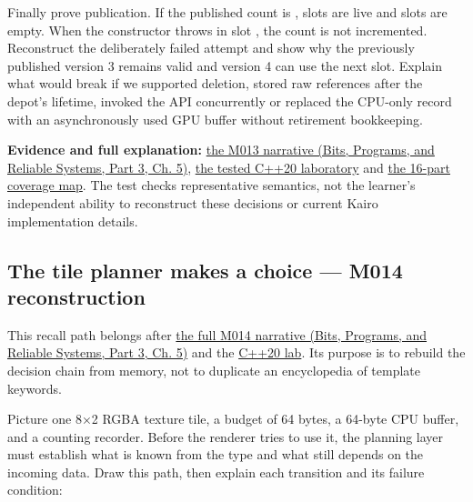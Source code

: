 Finally prove publication. If the published count is , slots \BookInlineCode{{{[}}{0}{,}{c}{)}}{{[}0,c)} are live and slots \BookInlineCode{{{[}}{c}{,}{C}{a}{p}{a}{c}{i}{t}{y}{)}}{{[}c,Capacity)} are empty. When the constructor throws in slot , the count is not incremented. Reconstruct the deliberately failed  attempt and show why the previously published version 3 remains valid and version 4 can use the next slot. Explain what would break if we supported deletion, stored raw references after the depot's lifetime, invoked the API concurrently or replaced the CPU-only record with an asynchronously used GPU buffer without retirement bookkeeping.

\textbf{Evidence and full explanation:} \href{../01-Bits-Programs-and-Reliable-Systems-P03/main.pdf\#01-foundations-i-ch005-one-asset-pipeline-many-asset-types-generic-code-without-accidental-promises}{the M013 narrative (Bits, Programs, and Reliable Systems, Part 3, Ch. 5)}, \hyperref[source-file-a5db53514d74ae247b4ac42f]{the tested C++20 laboratory} and \hyperref[appendix-fd090d982a15-m013-parts-201216-generic-asset-preparation-with-constrained-apis]{the 16-part coverage map}. The test checks representative semantics, not the learner's independent ability to reconstruct these decisions or current Kairo implementation details.

\subsection{The tile planner makes a choice --- M014 reconstruction}\label{appendix-960160274237-the-tile-planner-makes-a-choice-m014-reconstruction}

\hypertarget{appendix-960160274237-the-tile-planner-makes-a-choice-m014-reconstruction}{}

This recall path belongs after \href{../01-Bits-Programs-and-Reliable-Systems-P03/main.pdf\#01-foundations-i-ch005-a-texture-tile-that-chooses-its-work-before-the-frame-begins}{the full M014 narrative (Bits, Programs, and Reliable Systems, Part 3, Ch. 5)} and the \hyperref[source-file-f5eb017280bb6b2ae6b1475d]{C++20 lab}. Its purpose is to rebuild the decision chain from memory, not to duplicate an encyclopedia of template keywords.

Picture one 8×2 RGBA texture tile, a budget of 64 bytes, a 64-byte CPU buffer, and a counting recorder. Before the renderer tries to use it, the planning layer must establish what is known from the type and what still depends on the incoming data. Draw this path, then explain each transition and its failure condition:

